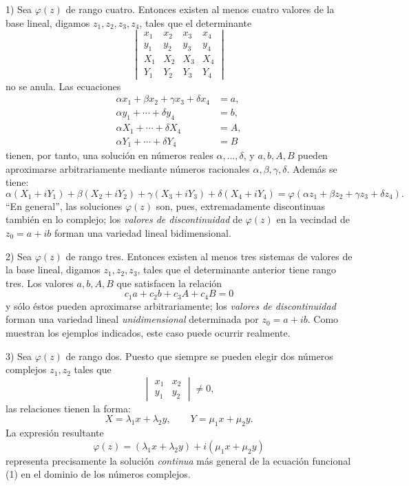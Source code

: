 1) Sea $\varphi(z)$ de rango cuatro. Entonces existen al menos cuatro valores de la base lineal, digamos $z_1,z_2,z_3,z_4$, tales que el determinante
\[
\begin{vmatrix}
x_1&x_2&x_3&x_4\\
y_1&y_2&y_3&y_4\\
X_1&X_2&X_3&X_4\\
Y_1&Y_2&Y_3&Y_4
\end{vmatrix}
\]
no se anula. Las ecuaciones
\[
\begin{aligned}
\alpha x_1+\beta x_2+\gamma x_3+\delta x_4&=a,\\
\alpha y_1+\cdots+\delta y_4&=b,\\
\alpha X_1+\cdots+\delta X_4&=A,\\
\alpha Y_1+\cdots+\delta Y_4&=B
\end{aligned}
\]
tienen, por tanto, una solución en números reales $\alpha,\ldots,\delta$, y $a,b,A,B$ pueden aproximarse arbitrariamente mediante números racionales $\alpha,\beta,\gamma,\delta$. Además se tiene:
\[
\alpha(X_1+iY_1)+\beta(X_2+iY_2)+\gamma(X_3+iY_3)+\delta(X_4+iY_4)
=\varphi(\alpha z_1+\beta z_2+\gamma z_3+\delta z_4).
\]
``En general'', las soluciones $\varphi(z)$ son, pues, extremadamente discontinuas también en lo complejo; los \emph{valores de discontinuidad} de $\varphi(z)$ en la vecindad de $z_0=a+ib$ forman una variedad lineal bidimensional.

2) Sea $\varphi(z)$ de rango tres. Entonces existen al menos tres sistemas de valores de la base lineal, digamos $z_1,z_2,z_3$, tales que el determinante anterior tiene rango tres. Los valores $a,b,A,B$ que satisfacen la relación
\[
c_1a+c_2b+c_3A+c_4B=0
\]
y sólo éstos pueden aproximarse arbitrariamente; los \emph{valores de discontinuidad} forman una variedad lineal \emph{unidimensional} determinada por $z_0=a+ib$. Como muestran los ejemplos indicados, este caso puede ocurrir realmente.

3) Sea $\varphi(z)$ de rango dos. Puesto que siempre se pueden elegir dos números complejos $z_1,z_2$ tales que
\[
\begin{vmatrix}x_1&x_2\\ y_1&y_2\end{vmatrix}\ne0,
\]
las relaciones tienen la forma:
\[
X=\lambda_1x+\lambda_2y,\qquad Y=\mu_1x+\mu_2y.
\]
La expresión resultante
\[
\varphi(z)=(\lambda_1x+\lambda_2y)+i(\mu_1x+\mu_2y)
\]
representa precisamente la solución \emph{continua} más general de la ecuación funcional (1) en el dominio de los números complejos.

